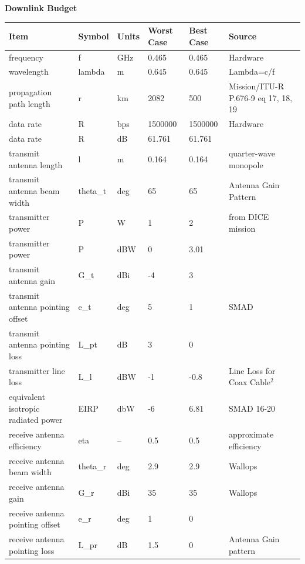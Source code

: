 \documentclass[12pt]{article}
\begin{document}
\textbf{Downlink Budget}
\small
\begin{center}
\begin{longtable}{| p{3.9cm} | p{1.6cm} | p{1.4cm} | p{1.4cm} | p{1.4cm} | p{5cm} |}
\hline
    \textbf{Item}  & \textbf{Symbol} & \textbf{Units}  & \textbf{Worst Case} & \textbf{Best Case} & \textbf{Source}  \\
    \hline \hline
    frequency & f     & GHz   & 0.465 & 0.465 & Hardware \\\hline
    wavelength & lambda & m     & 0.645 & 0.645 & Lambda=c/f \\\hline
    propagation path length & r     & km    & 2082  & 500   & Mission/ITU-R P.676-9 eq 17, 18, 19 \\\hline
    data rate & R     & bps   & 1500000 & 1500000 & Hardware \\\hline
    data rate & R     & dB    & 61.761 & 61.761 &  \\\hline
    transmit antenna length & l     & m     & 0.164 & 0.164 & quarter-wave monopole \\\hline
    transmit antenna beam width & theta\_t & deg   & 65    & 65    & Antenna Gain Pattern \\\hline
    transmitter power & P     & W     & 1     & 2     & from DICE mission \\\hline
    transmitter power & P     & dBW   & 0     & 3.01  &  \\\hline
    transmit antenna gain & G\_t  & dBi   & -4    & 3     &  \\\hline
    transmit antenna pointing offset & e\_t  & deg   & 5     & 1     & SMAD \\\hline
    transmit antenna pointing loss & L\_pt & dB    & 3     & 0     &  \\\hline
    transmitter line loss & L\_l  & dBW   & -1    & -0.8  & Line Loss for Coax Cable$^2$ \\\hline
    equivalent isotropic radiated power & EIRP  & dbW   & -6    & 6.81  & SMAD 16-20 \\\hline
    receive antenna efficiency & eta   & --    & 0.5   & 0.5   & approximate efficiency \\\hline
    receive antenna beam width & theta\_r & deg   & 2.9   & 2.9   & Wallops \\\hline
    receive antenna gain & G\_r  & dBi   & 35    & 35    & Wallops \\\hline
    receive antenna pointing offset & e\_r  & deg   & 1     & 0     &  \\\hline
    receive antenna pointing loss & L\_pr & dB    & 1.5   & 0     & Antenna Gain pattern \\\hline

\end{longtable}
\end{center}
\end{document}
